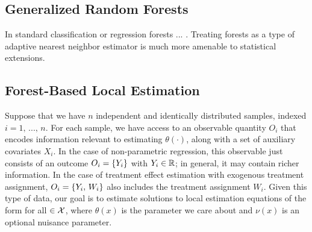 \documentclass[aos]{imsart}
\theoremstyle{plain}
\theoremstyle{definition}
\theoremstyle{remark}
\begin{document}
\begin{CJK}{UTF8}{gbsn}







\section{Generalized Random Forests}



In standard classification or regression forests ... .
Treating forests as a type of adaptive nearest neighbor estimator is much more amenable to statistical extensions.

\subsection{Forest-Based Local Estimation}
\label{sec:ANN}

Suppose that we have $n$ independent and identically distributed samples, indexed
$ i = 1, \, ..., \, n$. For each sample, we have
access to an observable quantity $O_i$ that encodes information
relevant to estimating $\theta(\cdot)$, along with a set of auxiliary covariates $X_i$. In the case of non-parametric
regression, this observable just consists of an outcome $O_i = \left\{Y_i\right\}$ with $Y_i \in \mathbb{R}$; in general, it may contain richer information. In the case of treatment effect estimation with exogenous treatment assignment, $O_i = \left\{Y_i, \, W_i\right\}$ also includes the treatment assignment $W_i$.
Given this type of data, our goal is to estimate solutions to local estimation equations of the form
 for all $\in \mathcal{X}$, 
where $\theta(x)$ is the parameter we care about and $\nu(x)$ is an optional nuisance parameter.



\end{CJK}
\end{document}
